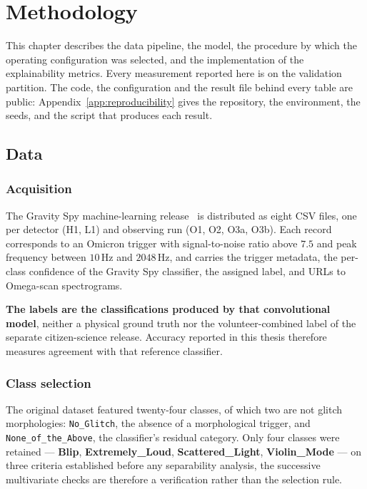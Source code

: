 \chapter{Methodology}
\label{ch:methodology}

This chapter describes the data pipeline, the model, the procedure by which the
operating configuration was selected, and the implementation of the explainability
metrics. Every measurement reported here is on the validation partition. The
code, the configuration and the result file behind every table are public:
Appendix~\ref{app:reproducibility} gives the repository, the environment, the
seeds, and the script that produces each result.

\section{Data}

\subsection{Acquisition}

The Gravity Spy machine-learning release~\cite{glanzer2021} is distributed as
eight CSV files, one per detector (H1, L1) and observing run (O1, O2, O3a, O3b).
Each record corresponds to an Omicron trigger with signal-to-noise ratio above
$7.5$ and peak frequency between $10$\,Hz and $2048$\,Hz, and carries the
trigger metadata, the per-class confidence of the Gravity Spy classifier, the
assigned label, and URLs to Omega-scan spectrograms.

\textbf{The labels are the classifications produced by that convolutional
model}, neither a physical ground truth nor the volunteer-combined label of the
separate citizen-science release. Accuracy reported in this thesis therefore
measures agreement with that reference classifier.

\subsection{Class selection}

The original dataset featured twenty-four classes, of which two are not glitch
morphologies: \texttt{No\_Glitch}, the absence of a morphological trigger, and
\texttt{None\_of\_the\_Above}, the classifier's residual category.
Only four classes were retained --- \textbf{Blip}, \textbf{Extremely\_Loud},
\textbf{Scattered\_Light}, \textbf{Violin\_Mode} --- on three criteria
established before any separability analysis, the successive multivariate checks
are therefore a verification rather than the selection rule.

